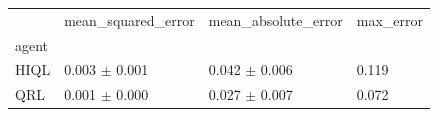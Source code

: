 \begin{tabular}{llll}
\toprule
 & mean_squared_error & mean_absolute_error & max_error \\
agent &  &  &  \\
\midrule
HIQL & 0.003 $\pm$ 0.001 & 0.042 $\pm$ 0.006 & 0.119 \\
QRL & 0.001 $\pm$ 0.000 & 0.027 $\pm$ 0.007 & 0.072 \\
\bottomrule
\end{tabular}

